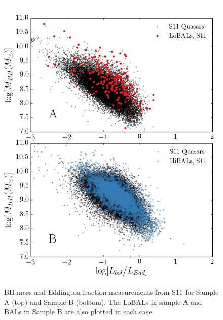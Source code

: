\begin{figure} %
\centering
\includegraphics[width=1.0\textwidth]{figures/ewpaper/bals_2x2_scatter.png}
\caption
{
BH mass and Eddington fraction measurements from S11 for Sample A (top)
and Sample B (bottom). The LoBALs in sample A and BALs in Sample B are
also plotted in each case.
}
\label{fig:bal_scatter}
\end{figure} %

